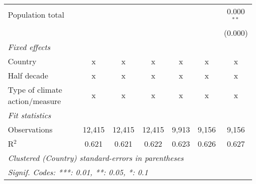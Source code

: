 \begin{tabular}{lcccccc}
   Population total                                           &               &               &                &                &                & 0.000$^{**}$\\   
                                                              &               &               &                &                &                & (0.000)\\   
   \emph{Fixed effects}\\
   Country                                                    & x             & x             & x              & x              & x              & x\\  
   Half decade                                                & x             & x             & x              & x              & x              & x\\  
   Type of climate action/measure                             & x             & x             & x              & x              & x              & x\\  
   \midrule \emph{Fit statistics}\\
   Observations                                               & 12,415        & 12,415        & 12,415         & 9,913          & 9,156          & 9,156\\  
   R$^2$                                                      & 0.621         & 0.621         & 0.622          & 0.623          & 0.626          & 0.627\\  
   \midrule
   \multicolumn{7}{l}{\emph{Clustered (Country) standard-errors in parentheses}}\\
   \multicolumn{7}{l}{\emph{Signif. Codes: ***: 0.01, **: 0.05, *: 0.1}}\\
\end{tabular}
\par\endgroup


